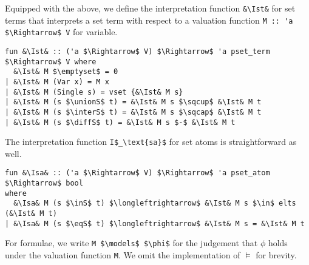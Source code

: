 \documentclass[sigplan,10pt,anonymous,review]{acmart}
\newcommand{\unionS}{\sqcup_\text{s}}
\newcommand{\interS}{\sqcap_\text{s}}
\newcommand{\diffS}{-_\text{s}}
\newcommand{\inS}{\in_\text{s}}
\newcommand{\eqS}{\approx_\text{s}}
\newcommand{\Ist}{I$_\text{st}$}
\newcommand{\Isa}{I$_\text{sa}$}
\begin{document}
Equipped with the above, we define the interpretation function \lstinline!&\Ist&! for set terms that interprets a set term with respect to a valuation function \lstinline!M :: 'a $\Rightarrow$ V! for variable.
\begin{lstlisting}
fun &\Ist& :: ('a $\Rightarrow$ V) $\Rightarrow$ 'a pset_term $\Rightarrow$ V where
  &\Ist& M $\emptyset$ = 0
| &\Ist& M (Var x) = M x
| &\Ist& M (Single s) = vset {&\Ist& M s}
| &\Ist& M (s $\unionS$ t) = &\Ist& M s $\sqcup$ &\Ist& M t 
| &\Ist& M (s $\interS$ t) = &\Ist& M s $\sqcap$ &\Ist& M t 
| &\Ist& M (s $\diffS$ t) = &\Ist& M s $-$ &\Ist& M t 
\end{lstlisting}
The interpretation function \lstinline!I$_\text{sa}$! for set atoms is straightforward as well.
\begin{lstlisting}
fun &\Isa& :: ('a $\Rightarrow$ V) $\Rightarrow$ 'a pset_atom $\Rightarrow$ bool
where
  &\Isa& M (s $\inS$ t) $\longleftrightarrow$ &\Ist& M s $\in$ elts (&\Ist& M t)
| &\Isa& M (s $\eqS$ t) $\longleftrightarrow$ &\Ist& M s = &\Ist& M t
\end{lstlisting}
For formulae, we write \lstinline!M $\models$ $\phi$! for the judgement that $\phi$ holds under the valuation function \lstinline!M!.
We omit the implementation of $\models$ for brevity.
\end{document}
